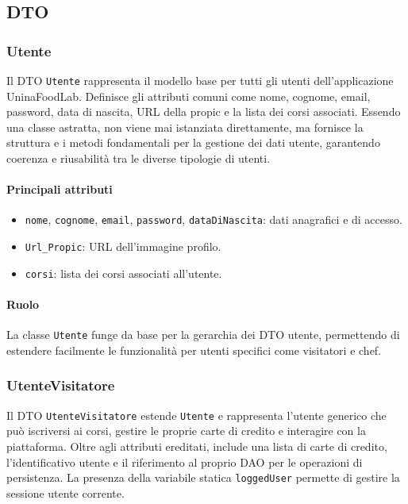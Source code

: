 \subsection{DTO}
\subsubsection{Utente}
Il DTO \texttt{Utente} rappresenta il modello base per tutti gli utenti dell'applicazione UninaFoodLab. Definisce gli attributi comuni come nome, cognome, email, password, data di nascita, URL della propic e la lista dei corsi associati. Essendo una classe astratta, non viene mai istanziata direttamente, ma fornisce la struttura e i metodi fondamentali per la gestione dei dati utente, garantendo coerenza e riusabilità tra le diverse tipologie di utenti.

\paragraph{Principali attributi}
\begin{itemize}
    \item \texttt{nome}, \texttt{cognome}, \texttt{email}, \texttt{password}, \texttt{dataDiNascita}: dati anagrafici e di accesso.
    \item \texttt{Url\_Propic}: URL dell'immagine profilo.
    \item \texttt{corsi}: lista dei corsi associati all'utente.
\end{itemize}

\paragraph{Ruolo}
La classe \texttt{Utente} funge da base per la gerarchia dei DTO utente, permettendo di estendere facilmente le funzionalità per utenti specifici come visitatori e chef.

\subsubsection{UtenteVisitatore}
Il DTO \texttt{UtenteVisitatore} estende \texttt{Utente} e rappresenta l'utente generico che può iscriversi ai corsi, gestire le proprie carte di credito e interagire con la piattaforma. Oltre agli attributi ereditati, include una lista di carte di credito, l'identificativo utente e il riferimento al proprio DAO per le operazioni di persistenza. La presenza della variabile statica \texttt{loggedUser} permette di gestire la sessione utente corrente.

